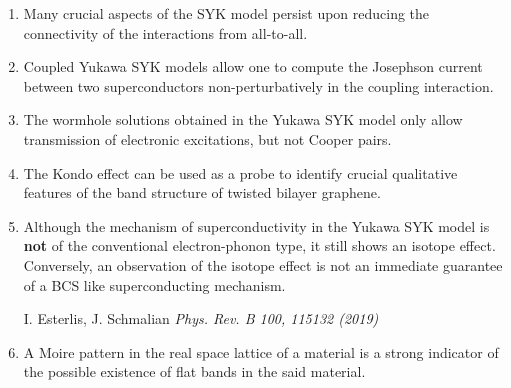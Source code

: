 \documentclass[pdftex,a5paper]{dissertation}
\begin{document}
{\small
\begin{enumerate}[leftmargin=*]
\setlength\itemsep{0.8em}

\item Many crucial aspects of the SYK model persist upon reducing the connectivity of the interactions from all-to-all.
\vspace{-10pt}
\begin{flushright}
\end{flushright}

\item Coupled Yukawa SYK models allow one to compute the Josephson current between two superconductors non-perturbatively in the coupling interaction.  
\vspace{-10pt}
\begin{flushright}
\end{flushright}

\item The wormhole solutions obtained in the Yukawa SYK model only allow transmission of electronic excitations, but not Cooper pairs. 
\vspace{-10pt}
\begin{flushright}
\end{flushright}

\item The Kondo effect can be used as a probe to identify crucial qualitative features of the band structure of twisted bilayer graphene. 
\vspace{-10pt}
\begin{flushright}
\end{flushright}


\item Although the mechanism of superconductivity in the Yukawa SYK model is \textbf{not} of the conventional electron-phonon type, it still shows an isotope effect. Conversely, an observation of the isotope effect is not an immediate guarantee of a BCS like superconducting mechanism. 
\vspace{-2pt}
\begin{flushright}
	I. Esterlis, J. Schmalian \emph{Phys. Rev. B 100, 115132 (2019)} 
\end{flushright}

\item A Moire pattern in the real space lattice of a material is a strong indicator of the possible existence of flat bands in the said material. 


\end{enumerate}}
\end{document}
